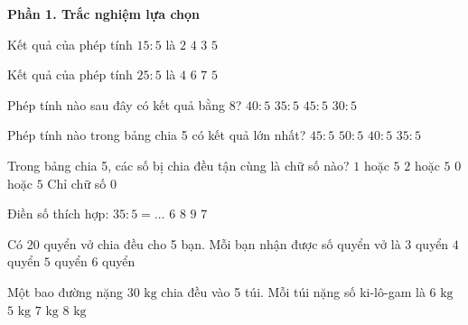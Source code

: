 \textbf{Phần 1. Trắc nghiệm lựa chọn}

\begin{ex} %
Kết quả của phép tính $15 : 5$ là
\choice
{$2$}
{$4$}
{\True $3$}
{$5$}
\end{ex}

\begin{ex} %
Kết quả của phép tính $25 : 5$ là
\choice
{$4$}
{$6$}
{$7$}
{\True $5$}
\end{ex}

\begin{ex} %
Phép tính nào sau đây có kết quả bằng 8?
\choice
{\True $40 : 5$}
{$35 : 5$}
{$45 : 5$}
{$30 : 5$}
\end{ex}

\begin{ex} %
Phép tính nào trong bảng chia 5 có kết quả lớn nhất?
\choice
{$45 : 5$}
{\True $50 : 5$}
{$40 : 5$}
{$35 : 5$}
\end{ex}

\begin{ex} %
Trong bảng chia 5, các số bị chia đều tận cùng là chữ số nào?
\choice
{$1$ hoặc $5$}
{$2$ hoặc $5$}
{\True $0$ hoặc $5$}
{Chỉ chữ số $0$}
\end{ex}

\begin{ex} %
Điền số thích hợp: $35 : 5 = \dots$
\choice
{$6$}
{$8$}
{$9$}
{\True $7$}
\end{ex}

\begin{ex} %
Có 20 quyển vở chia đều cho 5 bạn. Mỗi bạn nhận được số quyển vở là
\choice
{$3$ quyển}
{\True $4$ quyển}
{$5$ quyển}
{$6$ quyển}
\end{ex}

\begin{ex} %
Một bao đường nặng $30\text{ kg}$ chia đều vào 5 túi. Mỗi túi nặng số ki-lô-gam là
\choice
{\True $6\text{ kg}$}
{$5\text{ kg}$}
{$7\text{ kg}$}
{$8\text{ kg}$}
\end{ex}

